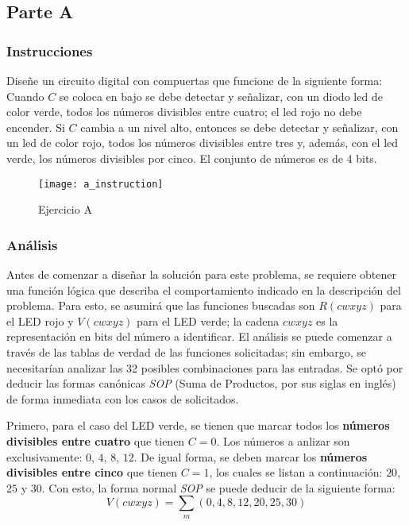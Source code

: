 \documentclass[../procedimientos.tex]{subfiles}
\begin{document}
\clearpage
\subsection{Parte A}
\subsubsection{Instrucciones}
Diseñe un circuito digital con compuertas que funcione de la siguiente forma:
Cuando $C$ se coloca en bajo se debe detectar y señalizar, con un diodo led de 
color verde, todos los números divisibles entre cuatro; el led rojo no debe 
encender. Si $C$ cambia a un nivel alto, entonces se debe detectar y 
señalizar, con un led de color rojo, todos los números divisibles entre tres 
y, además, con el led verde, los números divisibles por cinco. El conjunto de 
números es de 4 bits.
\begin{figure}[H]
  \centering
  \texttt{[image: a\_instruction]}
  \caption{Ejercicio A}
  \label{fig:a_inst}
\end{figure}

\subsubsection{Análisis}\label{subs:analisis_a}
Antes de comenzar a diseñar la solución para este problema, se requiere 
obtener una función lógica que describa el comportamiento indicado en la 
descripción del problema. Para esto, se asumirá que las funciones buscadas son 
$R(cwxyz)$ para el LED rojo y $V(cwxyz)$ para el LED verde; la cadena $cwxyz$ 
es la representación en bits del número a identificar. El análisis se puede 
comenzar a través de las tablas de verdad de las funciones solicitadas; sin 
embargo, se necesitarían analizar las 32 posibles combinaciones para las 
entradas. Se optó por deducir las formas canónicas \textit{SOP} (Suma de 
Productos, por sus siglas en inglés) de forma inmediata con los casos de 
solicitados.

Primero, para el caso del LED verde, se tienen que marcar todos los 
\textbf{números divisibles entre cuatro} que tienen $C=0$. Los números a 
anlizar son exclusivamente: $0$, $4$, $8$, $12$. De igual forma, se deben 
marcar los \textbf{números divisibles entre cinco} que tienen $C=1$, los 
cuales se listan a continuación: $20$, $25$ y $30$. Con esto, la forma normal 
\textit{SOP} se puede deducir de la siguiente forma:
\begin{equation*}
  V(cwxyz) = \sum_m (0, 4, 8, 12, 20, 25, 30)
\end{equation*}
\end{document}
